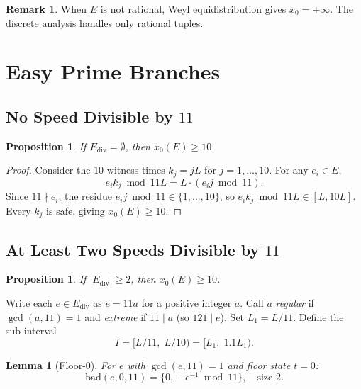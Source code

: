 \documentclass[11pt]{article}
\newtheorem{proposition}[theorem]{Proposition}
\newtheorem{lemma}[theorem]{Lemma}
\theoremstyle{definition}
\newtheorem{remark}[theorem]{Remark}
\newcommand{\Ediv}{E_{\mathrm{div}}}
\newcommand{\bad}{\mathrm{bad}}
\begin{document}
\begin{remark}
  When $E$ is not rational, Weyl equidistribution gives $x_0 = +\infty$.
  The discrete analysis handles only rational tuples.
\end{remark}

\section{Easy Prime Branches}

\subsection{No Speed Divisible by $11$}
\label{sec:nodiv}

\begin{proposition}
  \label{prop:nodiv}
  If $\Ediv = \emptyset$, then $x_0(E) \geq 10$.
\end{proposition}

\begin{proof}
  Consider the $10$ witness times $k_j = jL$ for $j = 1, \ldots, 10$.
  For any $e_i \in E$,
  \[
    e_i k_j \bmod 11L = L \cdot (e_i j \bmod 11).
  \]
  Since $11 \nmid e_i$, the residue $e_i j \bmod 11 \in \{1,\ldots,10\}$,
  so $e_i k_j \bmod 11L \in [L, 10L]$.
  Every $k_j$ is safe, giving $x_0(E) \geq 10$.
\end{proof}

\subsection{At Least Two Speeds Divisible by $11$}
\label{sec:multdiv}

\begin{proposition}
  \label{prop:multdiv}
  If $|\Ediv| \geq 2$, then $x_0(E) \geq 10$.
\end{proposition}

Write each $e \in \Ediv$ as $e = 11a$ for a positive integer $a$.
Call $a$ \emph{regular} if $\gcd(a, 11) = 1$ and \emph{extreme} if
$11 \mid a$ (so $121 \mid e$).
Set $L_1 = L/11$.
Define the sub-interval
\[
  I = [L/11,\; L/10) = [L_1,\; 1.1L_1).
\]

\begin{lemma}[Floor-0]
  \label{lem:floor0}
  For $e$ with $\gcd(e, 11) = 1$ and floor state $t = 0$:
  \[
    \bad(e, 0, 11) = \{0,\; {-e^{-1}} \bmod 11\}, \quad \text{size } 2.
  \]
\end{lemma}
\end{document}
